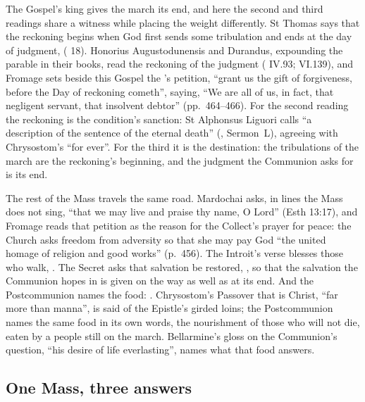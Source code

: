 The Gospel's king gives the march its end, and here the second and third readings
share a witness while placing the weight differently. St Thomas says that the
reckoning begins when God first sends some tribulation and ends at the day of
judgment,  ( 18). Honorius
Augustodunensis and Durandus, expounding the parable in their books, read the
reckoning of the judgment ( IV.93;  VI.139),
and Fromage sets beside this Gospel the 's petition, ``grant us
the gift of forgiveness, before the Day of reckoning cometh'', saying, ``We are all
of us, in fact, that negligent servant, that insolvent debtor'' (pp.~464--466).
For the second reading the reckoning is the condition's sanction: St Alphonsus
Liguori calls  ``a description of the sentence of
the eternal death'' (, Sermon~L), agreeing with
Chrysostom's ``for ever''. For the third it is the destination: the tribulations
of the march are the reckoning's beginning, and the judgment the Communion asks
for is its end.

The rest of the Mass travels the same road. Mardochai asks, in lines the Mass does
not sing, ``that we may live and praise thy name, O Lord'' (Esth 13:17), and
Fromage reads that petition as the reason for the Collect's prayer for peace: the
Church asks freedom from adversity so that she may pay God ``the united homage of
religion and good works'' (p.~456). The Introit's verse blesses those who walk,
. The Secret asks that salvation be restored, , so that the salvation the Communion hopes in is given on the way
as well as at its end. And the Postcommunion names the food: . Chrysostom's Passover that is Christ, ``far more than manna'', is said
of the Epistle's girded loins; the Postcommunion names the same food in its own
words, the nourishment of those who will not die, eaten by a people still on the
march. Bellarmine's gloss on the Communion's question, ``his desire of life
everlasting'', names what that food answers.

\subsection{One Mass, three answers}

